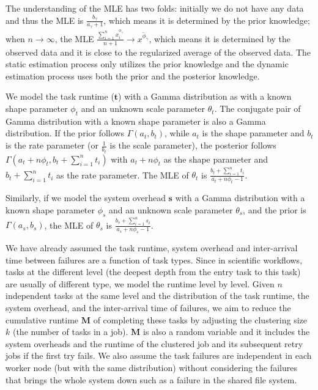 The understanding of the MLE has two folds: initially we do not have any data and thus the MLE is $\displaystyle\frac{b_{\gamma}}{a_{\gamma}+1}$, which means it is determined by the prior knowledge; when $n\to\infty$, the MLE $\displaystyle\frac{\displaystyle\sum_{i=1}^n{x_i^{\phi_{\gamma}}}}{n+1}\to\overline{x^{\phi_{\gamma}}}$, which means it is determined by the observed data and it is close to the regularized average of the observed data. The static estimation process only utilizes the prior knowledge and the dynamic estimation process uses both the prior and the posterior knowledge. 

We model the task runtime ($\bm t$) with a Gamma distribution as \cite{Sun2003, Iosup2008} with a known shape parameter $\phi_{t}$ and an unknown scale parameter $\theta_t$. The conjugate pair of Gamma distribution with a known shape parameter is also a Gamma distribution. If the prior follows $\Gamma(a_t, b_t)$, while $a_t$ is the shape parameter and $b_t$ is the rate parameter (or $\displaystyle \frac{1}{b_t}$ is the scale parameter), the posterior follows $\Gamma(a_t+n\phi_t, b_t+\displaystyle\sum_{i=1}^n{t_i})$ with $a_t+n\phi_t$ as the shape parameter and $b_t+\displaystyle\sum_{i=1}^n{t_i}$ as the rate parameter. The MLE of $\theta_t$ is $\displaystyle\frac{b_t+\displaystyle\sum_{i=1}^n{t_i}}{a_t+n\phi_t-1}$. 

Similarly, if we model the system overhead $\bm s$ with a Gamma distribution with a known shape parameter $\phi_{s}$ and an unknown scale parameter $\theta_s$, and the prior is $\Gamma(a_s, b_s)$, the MLE of $\theta_s$ is $\displaystyle\frac{b_s+\displaystyle\sum_{i=1}^n{s_i}}{a_s+n\phi_s-1}$.

We have already assumed the task runtime, system overhead and inter-arrival time between failures are a function of task types. Since in scientific workflows, tasks at the different level (the deepest depth from the entry task to this task) are usually of different type, we model the runtime level by level. Given $n$ independent tasks at the same level and the distribution of the task runtime, the system overhead, and the inter-arrival time of failures, we aim to reduce the cumulative runtime $\bm M$ of completing these tasks by adjusting the clustering size $k$ (the number of tasks in a job). 
$\bm M$ is also a random variable and it includes the system overheads and the runtime of the clustered job and its subsequent retry jobs if the first try fails. We also assume the task failures are independent in each worker node (but with the same distribution) without considering the failures that brings the whole system down such as a failure in the shared file system. 

